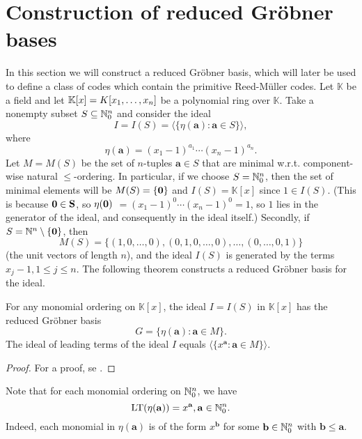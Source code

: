 \documentclass[english,bachelor]{liumaiex}
\begin{document}
\section{Construction of reduced Gröbner bases}
In this section we will construct a reduced Gröbner basis, which will later be used to define a class of codes which contain the primitive Reed-M{\"u}ller codes. Let $\mathbb{K}$ be a field and let $\mathbb{K}[x]=K[x_1,\dots, x_n]$ be a polynomial ring over $\mathbb{K}$. Take a nonempty subset $S\subseteq\mathbb{N}_{0}^n$ and consider the ideal 
\begin{displaymath}
I=I(S)=\langle\{\eta(\mathbf{a})\colon\mathbf{a}\in S\}\rangle,
\end{displaymath}
where
\begin{displaymath}
\eta(\mathbf{a})=(x_1-1)^{a_1}\cdots(x_n-1)^{a_n}.
\end{displaymath}
Let $M=M(S)$ be the set of $n$-tuples $\mathbf{a}\in S$ that are minimal w.r.t. component-wise natural $\leq$-ordering. In particular, if we choose $S=\mathbb{N}_{0}^n$, then the set of minimal elements will be $M(S)=\{\bf{0}\}$ and $I(S)=\mathbb{K}[x]$ since $1\in I(S)$. (This is because $\bf{0} \in S$, so $\eta(\bf{0})$ $=(x_1-1)^0\cdots(x_n-1)^0=1$, so $1$ lies in the generator of the ideal, and consequently in the ideal itself.) Secondly, if $S=\mathbb{N}^n\setminus\{\bf{0}\}$, then
\begin{displaymath}
M(S) = \{(1,0,\dots,0), (0,1,0,\dots,0),\dots,(0,\dots,0,1)\}
\end{displaymath}
(the unit vectors of length $n$), and the ideal $I(S)$ is generated by the terms $x_j-1, 1\leq j\leq n$. The following theorem constructs a reduced Gröbner basis for the ideal.

\begin{thm}
\label{thm:redgrobner}
For any monomial ordering on $\mathbb{K}[x]$, the ideal $I=I(S)$ in $\mathbb{K}[x]$ has the reduced Gröbner basis
\begin{displaymath}
G=\{\eta(\mathbf{a})\colon\mathbf{a}\in M\}.
\end{displaymath}
The ideal of leading terms of the ideal $I$ equals $\langle \{x^\mathbf{a} \colon \mathbf{a}\in M\}\rangle.$
\end{thm}
\begin{proof}
For a proof, se \cite[pp. 40-43]{phd}.
\end{proof}
Note that for each monomial ordering on $\mathbb{N}_{0}^n$, we have $$\textrm{LT}(\eta(\mathbf{a}))=x^\mathbf{a}, \mathbf{a}\in\mathbb{N}_{0}^n.$$ Indeed, each monomial in $\eta(\mathbf{a})$ is of the form $x^\mathbf{b}$ for some $\mathbf{b}\in\mathbb{N}_{0}^n$ with $\mathbf{b}\leq\mathbf{a}$.
\end{document}
